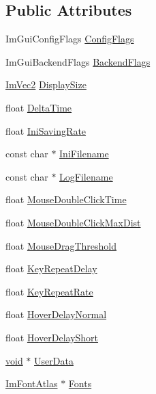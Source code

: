 \subsection*{Public Attributes}
\begin{DoxyCompactItemize}
\item 
Im\+Gui\+Config\+Flags \hyperlink{structImGuiIO_a6267b8a1ffa964035e6540f5e4296e39}{Config\+Flags}
\item 
Im\+Gui\+Backend\+Flags \hyperlink{structImGuiIO_a92288d3e802788c8c408eac2c12e709c}{Backend\+Flags}
\item 
\hyperlink{structImVec2}{Im\+Vec2} \hyperlink{structImGuiIO_a042cfb90bdc9ccfe37f86b92ade759fd}{Display\+Size}
\item 
float \hyperlink{structImGuiIO_a5068d5414a19c2a1bf58029bd732a7c7}{Delta\+Time}
\item 
float \hyperlink{structImGuiIO_a9b37eea17baa240a93b1288673a6eeb9}{Ini\+Saving\+Rate}
\item 
const char $\ast$ \hyperlink{structImGuiIO_a89e8efe8f82b539c961dc22cc2499402}{Ini\+Filename}
\item 
const char $\ast$ \hyperlink{structImGuiIO_ae77a1beed11820366800645232a6ad1c}{Log\+Filename}
\item 
float \hyperlink{structImGuiIO_aee056f6ed15363e0bcd8d879b312da7c}{Mouse\+Double\+Click\+Time}
\item 
float \hyperlink{structImGuiIO_a13334c1522aadc12af0ce3b31b0eb3a1}{Mouse\+Double\+Click\+Max\+Dist}
\item 
float \hyperlink{structImGuiIO_ad8b9a9924b0d6bde6a0fa35c17aa54ae}{Mouse\+Drag\+Threshold}
\item 
float \hyperlink{structImGuiIO_a390537e7cba21b98a8f89df857ea59fb}{Key\+Repeat\+Delay}
\item 
float \hyperlink{structImGuiIO_accd71987c895c4aec6d1a8c368cc9e0e}{Key\+Repeat\+Rate}
\item 
float \hyperlink{structImGuiIO_adf38bc0b3d5f77249b444f0872edc039}{Hover\+Delay\+Normal}
\item 
float \hyperlink{structImGuiIO_a1908fcfa605ff6ae0591891fee77c88d}{Hover\+Delay\+Short}
\item 
\hyperlink{imgui__impl__opengl3__loader_8h_ac668e7cffd9e2e9cfee428b9b2f34fa7}{void} $\ast$ \hyperlink{structImGuiIO_a8c5e74fd39c2655455329e09529da7d3}{User\+Data}
\item 
\hyperlink{structImFontAtlas}{Im\+Font\+Atlas} $\ast$ \hyperlink{structImGuiIO_a24e4f5201fe8780267abc2acfc24254c}{Fonts}
\item 

\end{DoxyCompactItemize}
